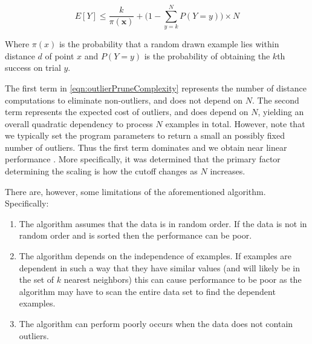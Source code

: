 \begin{equation}
\label{eqn:outlierPruneComplexity}
E[Y] \leq \frac{k}{\pi(\textbf{x})} + \Bigg(1 - \sum_{y=k}^{N} P(Y=y)\Bigg) \times N
\end{equation}

Where $\pi(x)$ is the probability that a random drawn example lies within
distance $d$ of point $x$ and $P(Y=y)$ is the probability of obtaining the $k$th
success on trial $y$.

The first term in \autoref{eqn:outlierPruneComplexity} represents the number of
distance computations to eliminate non-outliers, and does not depend on $N$. The
second term represents the expected cost of outliers, and does depend on $N$,
yielding an overall quadratic dependency to process $N$ examples in total.
However, note that we typically set the program parameters to return a small an
possibly fixed number of outliers. Thus the first term dominates and we obtain
near linear performance \cite{Bay:2003}. More specifically, it was determined
that the primary factor determining the scaling is how the cutoff changes as $N$
increases.

There are, however, some limitations of the aforementioned algorithm.
Specifically:
\begin{enumerate}
    \item The algorithm assumes that the data is in random order. If the data is
        not in random order and is sorted then the performance can be poor.
    \item The algorithm depends on the independence of examples. If examples are
        dependent in such a way that they have similar values (and will likely
        be in the set of $k$ nearest neighbors) this can cause performance to be
        poor as the algorithm may have to scan the entire data set to find the
        dependent examples.
    \item The algorithm can perform poorly occurs when the data does not contain
        outliers.
\end{enumerate}

